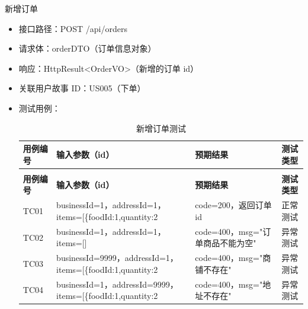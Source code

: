 \begin{levellist}
\begin{levellist}
        \item 新增订单
        \begin{itemize}
            \item 接口路径：POST /api/orders
            \item 请求体：orderDTO（订单信息对象）
            \item 响应：HttpResult<OrderVO>（新增的订单 id）
            \item 关联用户故事 ID：US005（下单）
            \item 测试用例：
                  \begin{longtable}{>{\centering\arraybackslash}m{1.7cm} >{\centering\arraybackslash}m{5.2cm} >{\centering\arraybackslash}m{4cm} >{\centering\arraybackslash}m{2cm}}

                      \caption{新增订单测试} \label{tab:training}                                                                                \\

                      \toprule
                      \textbf{用例编号} & \textbf{输入参数（id）}                                          & \textbf{预期结果}           & \textbf{测试类型} \\
                      \midrule
                      \endfirsthead

                      \multicolumn{4}{c}{{\tablename\ \thetable{} 续表}}                                                                     \\
                      \toprule
                      \textbf{用例编号} & \textbf{输入参数（id）}                                          & \textbf{预期结果}           & \textbf{测试类型} \\
                      \midrule
                      \endhead

                      \bottomrule
                      \endfoot

                      TC01          & businessId=1，addressId=1，items=[\{foodId:1,quantity:2}]    & code=200，返回订单 id        & 正常测试          \\
                      TC02          & businessId=1，addressId=1，items=[]                          & code=400，msg="订单商品不能为空" & 异常测试          \\
                      TC03          & businessId=9999，addressId=1，items=[\{foodId:1,quantity:2}] & code=400，msg="商铺不存在"    & 异常测试          \\
                      TC04          & businessId=1，addressId=9999，items=[\{foodId:1,quantity:2}] & code=400，msg="地址不存在"    & 异常测试          \\
                  \end{longtable}
        \end{itemize}


\end{levellist}
\end{levellist}
